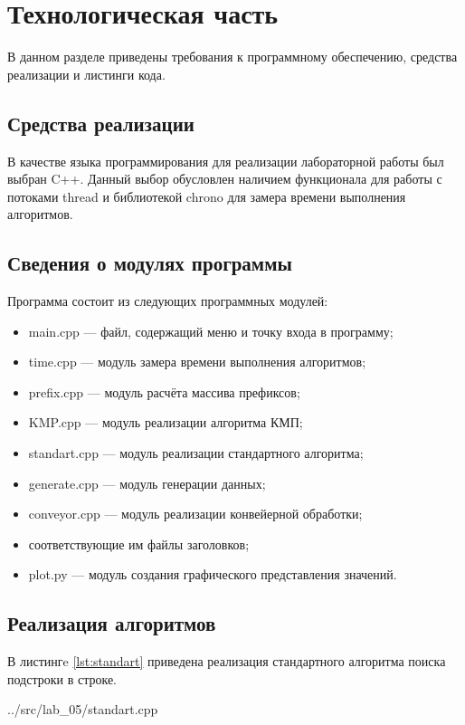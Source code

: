 \section{Технологическая часть}
В данном разделе приведены требования к программному обеспечению, средства реализации и листинги кода.

\subsection{Средства реализации}
В качестве языка программирования для реализации лабораторной работы был выбран C++.
Данный выбор обусловлен наличием функционала для работы с потоками thread и библиотекой chrono для замера времени выполнения алгоритмов.

\subsection{Сведения о модулях программы}
Программа состоит из следующих программных модулей:
\begin{itemize}
	\item main.cpp --- файл, содержащий меню и точку входа в программу;
	\item time.cpp --- модуль замера времени выполнения алгоритмов;
	\item prefix.cpp --- модуль расчёта массива префиксов;
	\item KMP.cpp --- модуль реализации алгоритма КМП;
	\item standart.cpp --- модуль реализации стандартного алгоритма;
	\item generate.cpp --- модуль генерации данных;
	\item conveyor.cpp --- модуль реализации конвейерной обработки;
	\item соответствующие им файлы заголовков;
	\item plot.py --- модуль создания графического представления значений.
\end{itemize}

\newpage
\subsection{Реализация алгоритмов}

В листингe \ref{lst:standart} приведена реализация стандартного алгоритма поиска подстроки в строке.

\begin{lstinputlisting}[
	label={lst:standart},
	caption={Стандартный алгоритм},
	firstline=11,
	lastline=26
	]{../src/lab_05/standart.cpp}
\end{lstinputlisting}

